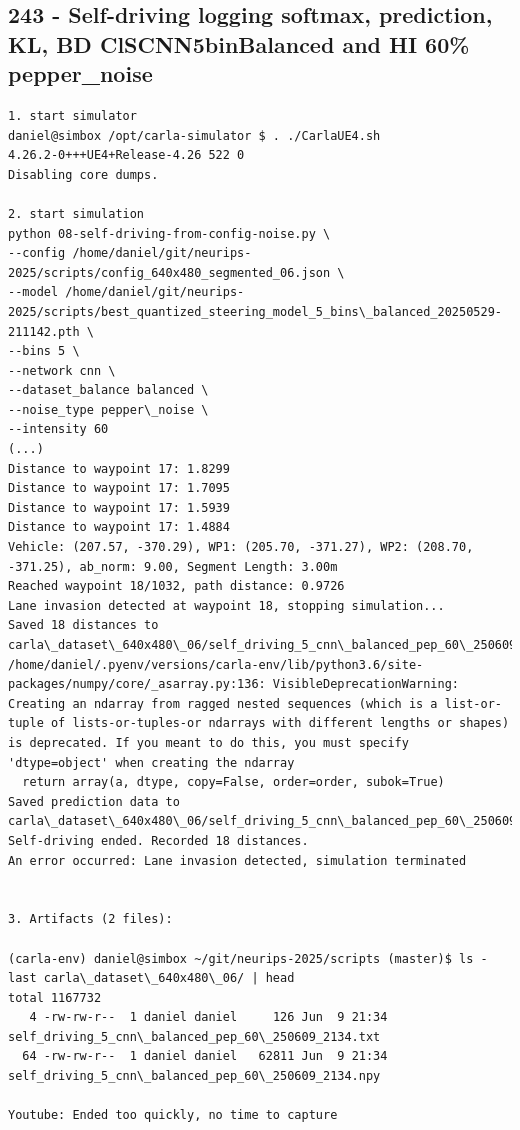 \subsection{243 - Self-driving logging softmax, prediction, KL, BD ClSCNN5binBalanced and HI 60\% pepper\_noise}
\label{app_res:243}

\begin{verbatim}
1. start simulator
daniel@simbox /opt/carla-simulator $ . ./CarlaUE4.sh 
4.26.2-0+++UE4+Release-4.26 522 0
Disabling core dumps.

2. start simulation
python 08-self-driving-from-config-noise.py \
--config /home/daniel/git/neurips-2025/scripts/config_640x480_segmented_06.json \
--model /home/daniel/git/neurips-2025/scripts/best_quantized_steering_model_5_bins\_balanced_20250529-211142.pth \
--bins 5 \
--network cnn \
--dataset_balance balanced \
--noise_type pepper\_noise \
--intensity 60   
(...)
Distance to waypoint 17: 1.8299
Distance to waypoint 17: 1.7095
Distance to waypoint 17: 1.5939
Distance to waypoint 17: 1.4884
Vehicle: (207.57, -370.29), WP1: (205.70, -371.27), WP2: (208.70, -371.25), ab_norm: 9.00, Segment Length: 3.00m
Reached waypoint 18/1032, path distance: 0.9726
Lane invasion detected at waypoint 18, stopping simulation...
Saved 18 distances to carla\_dataset\_640x480\_06/self_driving_5_cnn\_balanced_pep_60\_250609_2134.txt
/home/daniel/.pyenv/versions/carla-env/lib/python3.6/site-packages/numpy/core/_asarray.py:136: VisibleDeprecationWarning: Creating an ndarray from ragged nested sequences (which is a list-or-tuple of lists-or-tuples-or ndarrays with different lengths or shapes) is deprecated. If you meant to do this, you must specify 'dtype=object' when creating the ndarray
  return array(a, dtype, copy=False, order=order, subok=True)
Saved prediction data to carla\_dataset\_640x480\_06/self_driving_5_cnn\_balanced_pep_60\_250609_2134.npy
Self-driving ended. Recorded 18 distances.
An error occurred: Lane invasion detected, simulation terminated


3. Artifacts (2 files):

(carla-env) daniel@simbox ~/git/neurips-2025/scripts (master)$ ls -last carla\_dataset\_640x480\_06/ | head
total 1167732
   4 -rw-rw-r--  1 daniel daniel     126 Jun  9 21:34 self_driving_5_cnn\_balanced_pep_60\_250609_2134.txt
  64 -rw-rw-r--  1 daniel daniel   62811 Jun  9 21:34 self_driving_5_cnn\_balanced_pep_60\_250609_2134.npy

Youtube: Ended too quickly, no time to capture

\end{verbatim}


